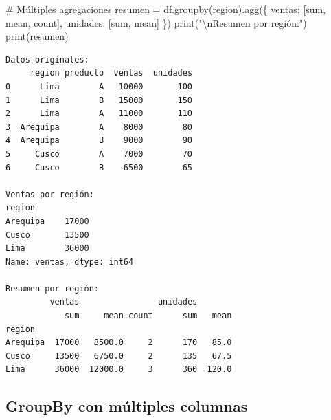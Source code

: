 \documentclass[
  doc,
  floatsintext,
  longtable,
  a4paper,
  nolmodern,
  notxfonts,
  notimes,
  12pt,
  colorlinks=true,linkcolor=blue,citecolor=blue,urlcolor=blue]{apa7}
\newenvironment{Shaded}{\begin{snugshade}}{\end{snugshade}}
\newcommand{\BuiltInTok}[1]{\textcolor[rgb]{0.00,0.23,0.31}{#1}}
\newcommand{\CharTok}[1]{\textcolor[rgb]{0.13,0.47,0.30}{#1}}
\newcommand{\CommentTok}[1]{\textcolor[rgb]{0.37,0.37,0.37}{#1}}
\newcommand{\NormalTok}[1]{\textcolor[rgb]{0.00,0.23,0.31}{#1}}
\newcommand{\OperatorTok}[1]{\textcolor[rgb]{0.37,0.37,0.37}{#1}}
\newcommand{\StringTok}[1]{\textcolor[rgb]{0.13,0.47,0.30}{#1}}
\begin{document}
\begin{Shaded}
\begin{Highlighting}[]
\CommentTok{\# Múltiples agregaciones}
\NormalTok{resumen }\OperatorTok{=}\NormalTok{ df.groupby(}\StringTok{\textquotesingle{}region\textquotesingle{}}\NormalTok{).agg(\{}
    \StringTok{\textquotesingle{}ventas\textquotesingle{}}\NormalTok{: [}\StringTok{\textquotesingle{}sum\textquotesingle{}}\NormalTok{, }\StringTok{\textquotesingle{}mean\textquotesingle{}}\NormalTok{, }\StringTok{\textquotesingle{}count\textquotesingle{}}\NormalTok{],}
    \StringTok{\textquotesingle{}unidades\textquotesingle{}}\NormalTok{: [}\StringTok{\textquotesingle{}sum\textquotesingle{}}\NormalTok{, }\StringTok{\textquotesingle{}mean\textquotesingle{}}\NormalTok{]}
\NormalTok{\})}
\BuiltInTok{print}\NormalTok{(}\StringTok{"}\CharTok{\textbackslash{}n}\StringTok{Resumen por región:"}\NormalTok{)}
\BuiltInTok{print}\NormalTok{(resumen)}
\end{Highlighting}
\end{Shaded}

\begin{verbatim}
Datos originales:
     region producto  ventas  unidades
0      Lima        A   10000       100
1      Lima        B   15000       150
2      Lima        A   11000       110
3  Arequipa        A    8000        80
4  Arequipa        B    9000        90
5     Cusco        A    7000        70
6     Cusco        B    6500        65

Ventas por región:
region
Arequipa    17000
Cusco       13500
Lima        36000
Name: ventas, dtype: int64

Resumen por región:
         ventas                unidades       
            sum     mean count      sum   mean
region                                        
Arequipa  17000   8500.0     2      170   85.0
Cusco     13500   6750.0     2      135   67.5
Lima      36000  12000.0     3      360  120.0
\end{verbatim}

\subsection{GroupBy con múltiples
columnas}\label{groupby-con-muxfaltiples-columnas}
\end{document}
